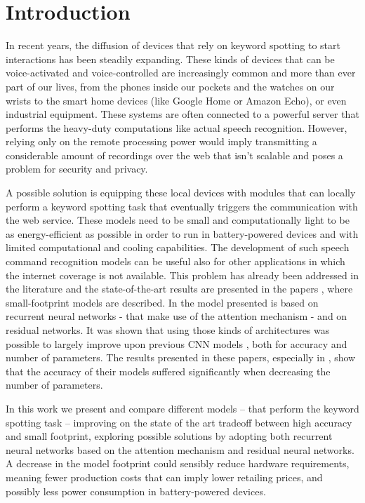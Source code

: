 
\section{Introduction}
\label{sec:introduction}

In recent years, the diffusion of devices that rely on keyword spotting to start interactions has been steadily expanding. These kinds of devices that can be voice-activated and voice-controlled are increasingly common and more than ever part of our lives, from the phones inside our pockets and the watches on our wrists to the smart home devices (like Google Home or Amazon Echo), or even industrial equipment.
These systems are often connected to a powerful server that performs the heavy-duty computations like actual speech recognition. However, relying only on the remote processing power would imply transmitting a considerable amount of recordings over the web that isn't scalable and poses a problem for security and privacy.


A possible solution is equipping these local devices with modules that can locally perform a keyword spotting task that eventually triggers the communication with the web service.
These models need to be small and computationally light to be as energy-efficient as possible in order to run in battery-powered devices and with limited computational and cooling capabilities.
The development of such speech command recognition models can be useful also for other applications in which the internet coverage is not available.
This problem has already been addressed in the literature and the state-of-the-art results are presented in the papers \cite{1} \cite{2}, where small-footprint models are described. In \cite{1} the model presented is based on recurrent neural networks - that make use of the attention mechanism - and on residual networks. It was shown that using those kinds of architectures was possible to largely improve upon previous CNN models \cite{3}, both for accuracy and number of parameters. The results presented in these papers, especially in \cite{2}, show that the accuracy of their models suffered significantly when decreasing the number of parameters.


In this work we present and compare different models -- that perform the keyword spotting task -- improving on the state of the art tradeoff between high accuracy and small footprint, exploring possible solutions by adopting both recurrent neural networks based on the attention mechanism and residual neural networks. A decrease in the model footprint could sensibly reduce hardware requirements, meaning fewer production costs that can imply lower retailing prices, and possibly less power consumption in battery-powered devices.


